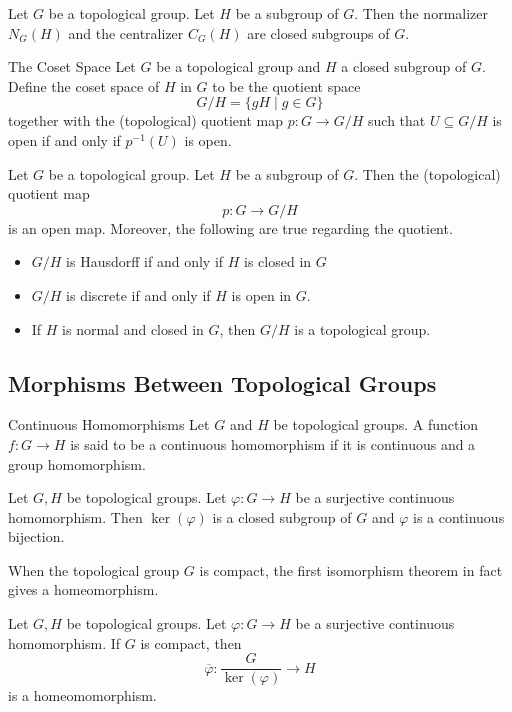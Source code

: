 \documentclass[a4paper]{article}
\begin{document}
\begin{prp}{}{} Let $G$ be a topological group. Let $H$ be a subgroup of $G$. Then the normalizer $N_G(H)$ and the centralizer $C_G(H)$ are closed subgroups of $G$. 
\end{prp}

\begin{defn}{The Coset Space}{} Let $G$ be a topological group and $H$ a closed subgroup of $G$. Define the coset space of $H$ in $G$ to be the quotient space $$G/H=\{gH\;|\;g\in G\}$$ together with the (topological) quotient map $p:G\to G/H$ such that $U\subseteq G/H$ is open if and only if $p^{-1}(U)$ is open. 
\end{defn}

\begin{thm}{}{} Let $G$ be a topological group. Let $H$ be a subgroup of $G$. Then the (topological) quotient map $$p:G\to G/H$$ is an open map. Moreover, the following are true regarding the quotient. 
\begin{itemize}
\item $G/H$ is Hausdorff if and only if $H$ is closed in $G$
\item $G/H$ is discrete if and only if $H$ is open in $G$. 
\item If $H$ is normal and closed in $G$, then $G/H$ is a topological group. 
\end{itemize}
\end{thm}

\subsection{Morphisms Between Topological Groups}
\begin{defn}{Continuous Homomorphisms}{} Let $G$ and $H$ be topological groups. A function $f:G\to H$ is said to be a continuous homomorphism if it is continuous and a group homomorphism. 
\end{defn}

\begin{prp}{}{} Let $G,H$ be topological groups. Let $\varphi:G\to H$ be a surjective continuous homomorphism. Then $\ker(\varphi)$ is a closed subgroup of $G$ and $\varphi$ is a continuous bijection. 
\end{prp}

When the topological group $G$ is compact, the first isomorphism theorem in fact gives a homeomorphism. 

\begin{prp}{}{} Let $G,H$ be topological groups. Let $\varphi:G\to H$ be a surjective continuous homomorphism. If $G$ is compact, then $$\overline{\varphi}:\frac{G}{\ker(\varphi)}\to H$$ is a homeomomorphism. 
\end{prp}
\end{document}
